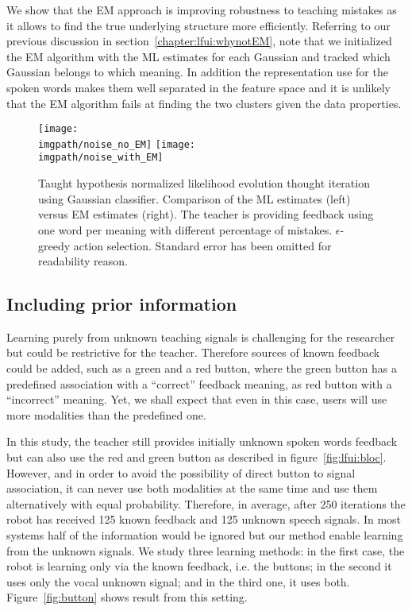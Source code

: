 We show that the EM approach is improving robustness to teaching mistakes as it allows to find the true underlying structure more efficiently. Referring to our previous discussion in section~\ref{chapter:lfui:whynotEM}, note that we initialized the EM algorithm with the ML estimates for each Gaussian and tracked which Gaussian belongs to which meaning. In addition the representation use for the spoken words makes them well separated in the feature space and it is unlikely that the EM algorithm fails at finding the two clusters given the data properties.

\begin{figure}[!htbp]
  \centering
  \texttt{[image: \\imgpath/noise\_no\_EM]}
  \texttt{[image: \\imgpath/noise\_with\_EM]}
  \caption{Taught hypothesis normalized likelihood evolution thought iteration using Gaussian classifier. Comparison of the ML estimates (left) versus EM estimates (right). The teacher is providing feedback using one word per meaning with different percentage of mistakes. $\epsilon$-greedy action selection. Standard error has been omitted for readability reason.}
  \label{fig:Noise}
\end{figure}

\subsection{Including prior information}
\label{sec:IncludingPriorInformation}

Learning purely from unknown teaching signals is challenging for the researcher but could be restrictive for the teacher. Therefore sources of known feedback could be added, such as a green and a red button, where the green button has a predefined association with a ``correct'' feedback meaning, as red button with a ``incorrect'' meaning. Yet, we shall expect that even in this case, users will use more modalities than the predefined one.  

In this study, the teacher still provides initially unknown spoken words feedback but can also use the red and green button as described in figure~\ref{fig:lfui:bloc}. However, and in order to avoid the possibility of direct button to signal association, it can never use both modalities at the same time and use them alternatively with equal probability. Therefore, in average, after 250 iterations the robot has received 125 known feedback and 125 unknown speech signals. In most systems half of the information would be ignored but our method enable learning from the unknown signals. We study three learning methods: in the first case, the robot is learning only via the known feedback, i.e. the buttons; in the second it uses only the vocal unknown signal; and in the third one, it uses both. Figure~\ref{fig:button} shows result from this setting. 

